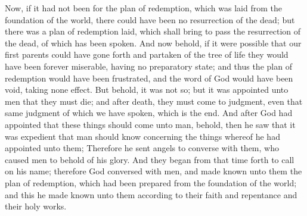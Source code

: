 Now, if it had not been for the plan of redemption, which was laid from the foundation of the world, there could have been no resurrection of the dead; but there was a plan of redemption laid, which shall bring to pass the resurrection of the dead, of which has been spoken.
\bverse \iffalse And now behold, if it were possible that our first parents could have gone forth and partaken of the tree of life they would have been forever miserable, having no preparatory state; and thus the plan of redemption would have been frustrated, and the word of God would have been void, taking none effect. \fi
And now behold, if it were possible that our first parents could have gone forth and partaken of the tree of life they would have been forever miserable, having no preparatory state; and thus the plan of redemption would have been frustrated, and the word of God would have been void, taking none effect.
\bverse \iffalse But behold, it was not so; but it was appointed unto men that they must die; and after death, they must come to judgment, even that same judgment of which we have spoken, which is the end. \fi
But behold, it was not so; but it was appointed unto men that they must die; and after death, they must come to judgment, even that same judgment of which we have spoken, which is the end.
\bverse \iffalse And after God had appointed that these things should come unto man, behold, then he saw that it was expedient that man should know concerning the things whereof he had appointed unto them; \fi
And after God had appointed that these things should come unto man, behold, then he saw that it was expedient that man should know concerning the things whereof he had appointed unto them;
\bverse \iffalse Therefore he sent angels to converse with them, who caused men to behold of his glory. \fi
Therefore he sent angels to converse with them, who caused men to behold of his glory.
\bverse \iffalse And they began from that time forth to call on his name; therefore God conversed with men, and made known unto them the plan of redemption, which had been prepared from the foundation of the world; and this he made known unto them according to their faith and repentance and their holy works. \fi
And they began from that time forth to call on his name; therefore God conversed with men, and made known unto them the plan of redemption, which had been prepared from the foundation of the world; and this he made known unto them according to their faith and repentance and their holy works.
\bverse \iffalse Wherefore, he gave commandments unto men, they having first transgressed the first commandments as to things which were temporal, and becoming as Gods, knowing good from evil, placing themselves in a state to act, or being placed in a state to act according to their wills and pleasures, whether to do evil or to do good-- \fi
